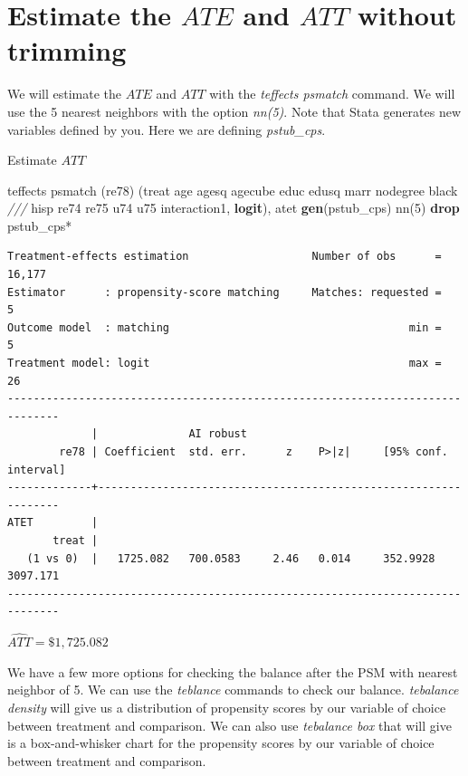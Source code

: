 \documentclass[
]{book}
\newenvironment{Shaded}{\begin{snugshade}}{\end{snugshade}}
\newcommand{\BaseNTok}[1]{\textcolor[rgb]{0.00,0.00,0.81}{#1}}
\newcommand{\CommentTok}[1]{\textcolor[rgb]{0.56,0.35,0.01}{\textit{#1}}}
\newcommand{\KeywordTok}[1]{\textcolor[rgb]{0.13,0.29,0.53}{\textbf{#1}}}
\newcommand{\NormalTok}[1]{#1}
\begin{document}
\section{\texorpdfstring{Estimate the \(ATE\) and \(ATT\) without trimming}{Estimate the ATE and ATT without trimming}}\label{estimate-the-ate-and-att-without-trimming}

We will estimate the \(ATE\) and \(ATT\) with the \emph{teffects psmatch} command. We will use the 5 nearest neighbors with the option \emph{nn(5)}. Note that Stata generates new variables defined by you. Here we are defining \emph{pstub\_cps}.

Estimate \(ATT\)

\begin{Shaded}
\begin{Highlighting}[]
\NormalTok{teffects psmatch (re78) (treat age agesq agecube educ edusq marr nodegree }\BaseNTok{black} \CommentTok{///}
\NormalTok{ hisp re74 re75 u74 u75 interaction1, }\KeywordTok{logit}\NormalTok{), atet }\KeywordTok{gen}\NormalTok{(pstub\_cps) nn(5)}
\KeywordTok{drop}\NormalTok{ pstub\_cps*}
\end{Highlighting}
\end{Shaded}

\begin{verbatim}
Treatment-effects estimation                   Number of obs      =     16,177
Estimator      : propensity-score matching     Matches: requested =          5
Outcome model  : matching                                     min =          5
Treatment model: logit                                        max =         26
------------------------------------------------------------------------------
             |              AI robust
        re78 | Coefficient  std. err.      z    P>|z|     [95% conf. interval]
-------------+----------------------------------------------------------------
ATET         |
       treat |
   (1 vs 0)  |   1725.082   700.0583     2.46   0.014     352.9928    3097.171
------------------------------------------------------------------------------
\end{verbatim}

\(\widehat{ATT} = \$1,725.082\)

We have a few more options for checking the balance after the PSM with nearest neighbor of 5. We can use the \emph{teblance} commands to check our balance. \emph{tebalance density} will give us a distribution of propensity scores by our variable of choice between treatment and comparison. We can also use \emph{tebalance box} that will give is a box-and-whisker chart for the propensity scores by our variable of choice between treatment and comparison.
\end{document}
